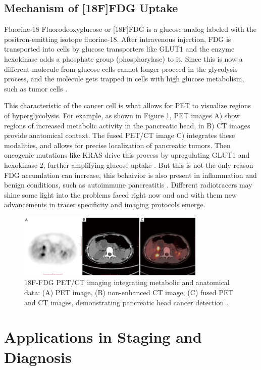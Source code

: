 \documentclass[11pt]{article} %
\begin{document}
\subsection{Mechanism of [18F]FDG Uptake}


Fluorine-18 Fluorodeoxyglucose or [18F]FDG is a glucose analog labeled with the positron-emitting isotope fluorine-18. After intravenous injection, FDG is transported into cells by glucose transporters like GLUT1 and  the enzyme hexokinase adds a phosphate group (phosphorylase) to it. Since this is now a different molecule from glucose cells cannot longer proceed in the glycolysis process, and the molecule gets trapped in cells with high glucose metabolism, such as tumor cells \cite{TG174, Zheng2018}.

This characteristic of the cancer cell is what allows for PET to visualize regions of hyperglycolysis. For example, as shown in Figure \ref{fig:PuFig1}, PET images A) show regions of increased metabolic activity in the pancreatic head, in B) CT images provide anatomical context. The fused PET/CT image C) integrates these modalities, and allows for precise localization of pancreatic tumors.
Then oncogenic mutations like KRAS drive this process by upregulating GLUT1 and hexokinase-2, further amplifying glucose uptake \cite{Deng2021}. But this is not the only reason FDG accumlation can increase, this behaivior is also present in inflammation and benign conditions, such as autoimmune pancreatitis \cite{Zheng2018}. Different radiotracers may shine some light into the problems faced right now and and with them new advancements in tracer specificity and imaging protocols emerge.

\begin{figure}[ht]
    \centering
    \includegraphics[width=0.8\textwidth]{assets/tcr-10-07-3560-f1.jpg}
    \caption{18F-FDG PET/CT imaging integrating metabolic and anatomical data: (A) PET image, (B) non-enhanced CT image, (C) fused PET and CT images, demonstrating pancreatic head cancer detection \cite{Pu2021}.}
    \label{fig:PuFig1}
\end{figure}

\section{Applications in Staging and Diagnosis}
\end{document}
